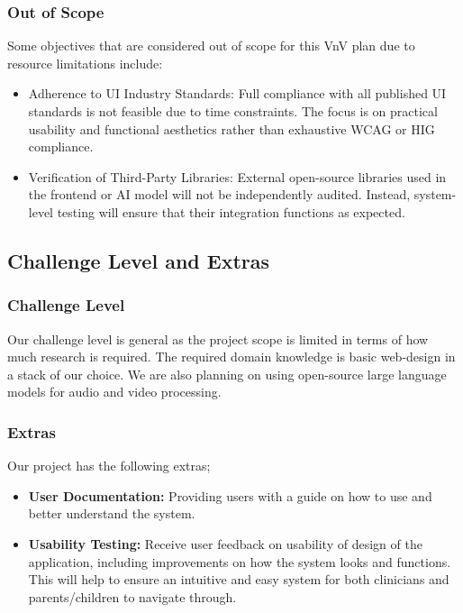 \documentclass[12pt, titlepage]{article}
\begin{document}
\subsubsection*{Out of Scope}
Some objectives that are considered out of scope for this VnV plan due to resource limitations include:
\begin{itemize}
  \item Adherence to UI Industry Standards: Full compliance with all published UI standards is not feasible due to time constraints. The focus is on practical usability and functional aesthetics rather than exhaustive WCAG or HIG compliance.
  \item Verification of Third-Party Libraries: External open-source libraries used in the frontend or AI model will not be independently audited. Instead, system-level testing will ensure that their integration functions as expected.
\end{itemize}
  
\subsection{Challenge Level and Extras}

\subsubsection{Challenge Level} 

Our challenge level is general as the project scope is limited in terms of how much
research is required. The required domain knowledge is basic web-design in a
stack of our choice. We are also planning on using open-source large language
models for audio and video processing.

\subsubsection{Extras}
Our project has the following extras;
\begin{itemize}
  \item \textbf{User Documentation: } Providing users with a guide on how to use and
  better understand the system. 
  \item \textbf{Usability Testing: } Receive user feedback on usability of design of the application, 
including improvements on how the system looks and functions. This will help to ensure an 
intuitive and easy system for both clinicians and parents/children to navigate through.
\end{itemize}
\end{document}
